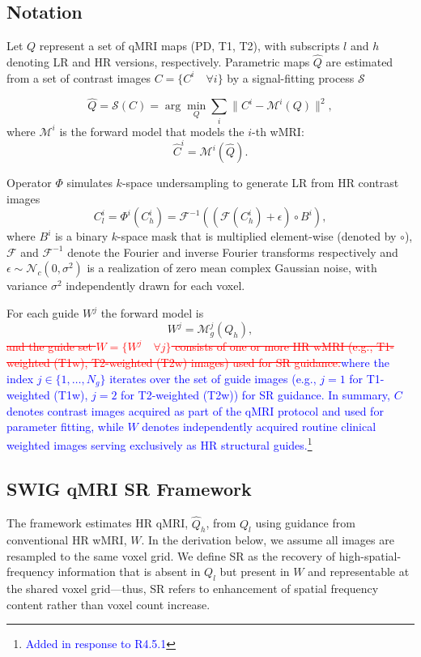 \documentclass[journal,twoside,web]{ieeecolor}
\newcommand{\added}[1]{\textcolor{blue}{#1}}      %
\newcommand{\deleted}[1]{\textcolor{red}{\st{#1}}} %
\begin{document}
\subsection{Notation}
Let $Q$ represent a set of qMRI maps (PD, T1, T2), with subscripts $l$ and $h$ denoting LR and HR versions, respectively. Parametric maps $\hat{Q}$ are estimated from a set of contrast images $C = \{ C^i\quad \forall i \}$ by a signal-fitting process $\mathcal{S}$

\begin{equation}
\hat{Q} = \mathcal{S}(C) = \arg\min_Q \sum_i \| C^i - \mathcal{M}^i(Q) \|^2,
\label{Signalfitting}
\end{equation}
where $\mathcal{M}^i$ is the forward model that models the $i$-th wMRI:
\begin{equation}
\hat{C}^i = \mathcal{M}^i(\hat{Q}).
\label{phmodel}
\end{equation} 


Operator \( \Phi \) simulates $k$-space undersampling to generate LR from HR contrast images
\begin{equation}
C^i_l = \Phi^i(C^i_h) = \mathcal{F}^{-1} ( (\mathcal{F}(C^i_h) + \epsilon) \circ B^i ),
\label{partialsampling}
\end{equation}
where \( B^i \) is a binary $k$-space mask that is multiplied element-wise (denoted by \( \circ \)), \( \mathcal{F} \) and \( \mathcal{F}^{-1} \) denote the Fourier and inverse Fourier transforms respectively and \( \epsilon \sim \mathcal{N}_c(0, \sigma^2) \) is a realization of zero mean complex Gaussian noise, with variance $\sigma^2$ independently drawn for each voxel.

For each guide $W^j$ the forward model is
\begin{equation}
    W^j = \mathcal{M}_g^j(Q_h),
    \label{phmodel1}
\end{equation}
\deleted{and the guide set $W = \{ W^j \quad \forall j \}$ consists of one or more HR wMRI (e.g., T1-weighted (T1w), T2-weighted (T2w) images) used for SR guidance.}\added{where the index $j \in \{1, \ldots, N_g\}$ iterates over the set of guide images (e.g., $j=1$ for T1-weighted (T1w), $j=2$ for T2-weighted (T2w)) for SR guidance. In summary, $C$ denotes contrast images acquired as part of the qMRI protocol and used for parameter fitting, while $W$ denotes independently acquired routine clinical weighted  images serving exclusively as HR structural guides.\footnote{\textcolor{blue}{Added in response to R4.5.1}}}

\subsection{SWIG qMRI SR Framework}
The framework estimates HR qMRI, $\hat{Q}_h$, from $Q_l$ using guidance from conventional HR wMRI, $W$. In the derivation below, we assume all images are resampled to the same voxel grid. We define SR as the recovery of high-spatial-frequency information that is absent in $Q_l$ but present in $W$ and representable at the shared voxel grid---thus, SR refers to enhancement of spatial frequency content rather than voxel count increase.
\end{document}
